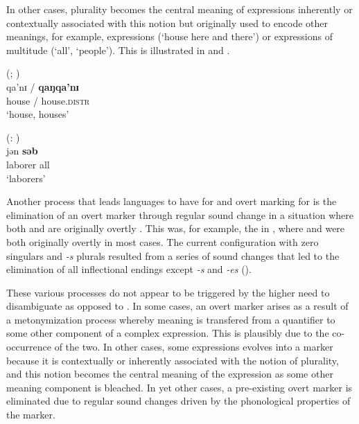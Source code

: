 \documentclass[output=paper]{langsci/langscibook}
\begin{document}
\z
\z


In other cases, plurality becomes the central meaning of expressions
inherently or contextually
associated with this notion but originally used to encode other meanings, for example,  expressions
(`house here and there') or expressions of multitude (`all', `people'). This is illustrated in  and .

\ea\label{paiute}
 (; \citealt[258]{Sapir1930})\\
\gll qa'nɪ​ / \textbf{{qaŋqa'nɪ​}}\\
house / house.\textsc{distr}\\
\glt `house, houses' 

\z

\ea\label{maithili}
 (: )\\
\gll jən \textbf{{səb}}\\
laborer all\\
\glt `laborers'

\z

Another process that leads languages to have  for 
and overt marking for  is the elimination of an overt 
marker through regular sound change in a situation where both 
and  are originally overtly . This was, for example, the  in
, where  and  were both originally overtly
   in most cases. The current
configuration with zero  singulars and {\em -s}  plurals
resulted from a series of sound changes that led to the
elimination of all inflectional endings except   {\em
  -s} and  {\em -es} (\citealt{Mosse}). 


These various processes do not appear to be triggered by the higher need to
disambiguate  as opposed to . In some cases, an overt
 marker arises as a result of a metonymization
process whereby  meaning is transfered from a quantifier to some
other component of a complex expression. This is plausibly due to the
co-occurrence of the two. In other cases, some
expressions evolves into a  marker because it is contextually or
inherently associated with the notion of plurality, and this notion becomes the
central meaning of the expression as some other meaning component is
bleached.  In yet
other cases, a pre-existing overt  marker is eliminated due to
regular sound changes driven by the phonological  properties of the
marker. 
\end{document}
